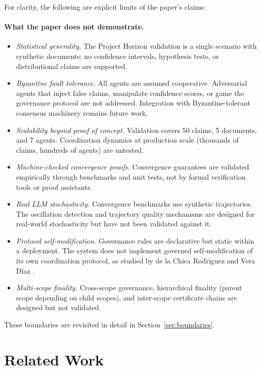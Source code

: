 \documentclass[11pt]{article}
\begin{document}
For clarity, the following are explicit limits of the paper's claims:

\paragraph{What the paper does not demonstrate.}
\begin{itemize}
  \item \emph{Statistical generality.} The Project Horizon validation is a single scenario with synthetic documents; no confidence intervals, hypothesis tests, or distributional claims are supported.
  \item \emph{Byzantine fault tolerance.} All agents are assumed cooperative. Adversarial agents that inject false claims, manipulate confidence scores, or game the governance protocol are not addressed. Integration with Byzantine-tolerant consensus machinery \cite{lamport1982,castro1999} remains future work.
  \item \emph{Scalability beyond proof of concept.} Validation covers 50 claims, 5 documents, and 7 agents. Coordination dynamics at production scale (thousands of claims, hundreds of agents) are untested.
  \item \emph{Machine-checked convergence proofs.} Convergence guarantees are validated empirically through benchmarks and unit tests, not by formal verification tools or proof assistants.
  \item \emph{Real LLM stochasticity.} Convergence benchmarks use synthetic trajectories. The oscillation detection and trajectory quality mechanisms are designed for real-world stochasticity but have not been validated against it.
  \item \emph{Protocol self-modification.} Governance rules are declarative but static within a deployment. The system does not implement governed self-modification of its own coordination protocol, as studied by de la Chica Rodriguez and Vera D\'{i}az \cite{delachica2026}.
  \item \emph{Multi-scope finality.} Cross-scope governance, hierarchical finality (parent scope depending on child scopes), and inter-scope certificate chains are designed but not validated.
\end{itemize}

These boundaries are revisited in detail in Section~\ref{sec:boundaries}.

\section{Related Work}
\end{document}
